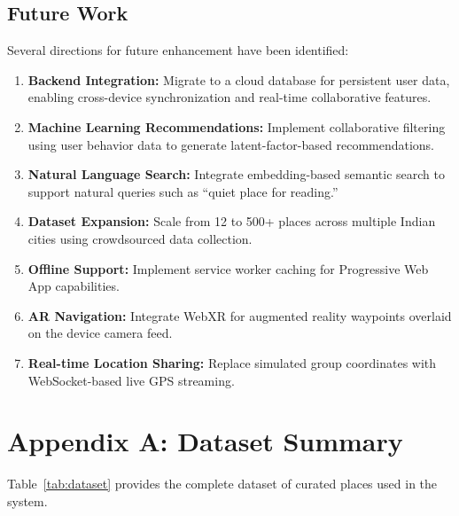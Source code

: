 \documentclass[conference]{IEEEtran}
\begin{document}
\subsection{Future Work}

Several directions for future enhancement have been identified:

\begin{enumerate}
    \item \textbf{Backend Integration:} Migrate to a cloud database for persistent user data, enabling cross-device synchronization and real-time collaborative features.
    \item \textbf{Machine Learning Recommendations:} Implement collaborative filtering using user behavior data to generate latent-factor-based recommendations.
    \item \textbf{Natural Language Search:} Integrate embedding-based semantic search to support natural queries such as ``quiet place for reading.''
    \item \textbf{Dataset Expansion:} Scale from 12 to 500+ places across multiple Indian cities using crowdsourced data collection.
    \item \textbf{Offline Support:} Implement service worker caching for Progressive Web App capabilities.
    \item \textbf{AR Navigation:} Integrate WebXR for augmented reality waypoints overlaid on the device camera feed.
    \item \textbf{Real-time Location Sharing:} Replace simulated group coordinates with WebSocket-based live GPS streaming.
\end{enumerate}

\section*{Appendix A: Dataset Summary}

Table~\ref{tab:dataset} provides the complete dataset of curated places used in the system.
\end{document}
